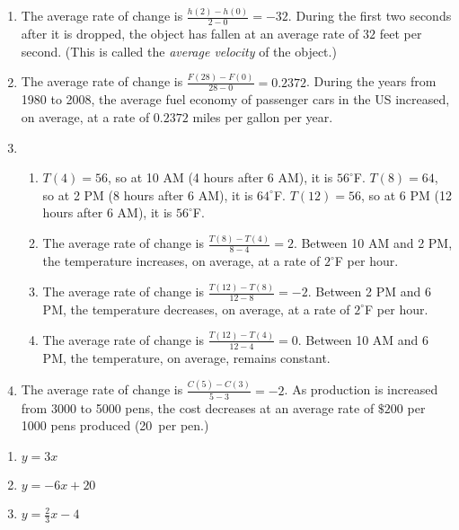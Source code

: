 \begin{enumerate}
\setcounter{enumi}{\value{HW}}


\item The average rate of change is $\frac{h(2) - h(0)}{2-0}=-32$.  During the first two seconds after it is dropped, the object has fallen at an average rate of $32$ feet per second.  (This is called the \textit{average velocity} of the object.)

\item The average rate of change is $\frac{F(28) - F(0)}{28-0}=0.2372$.  During the years from 1980 to 2008, the average fuel economy of passenger cars in the US increased, on average, at a rate of $0.2372$ miles per gallon per year.

\item 
\begin{enumerate}

\item  $T(4) = 56$, so at 10 AM (4 hours after 6 AM), it is $56^{\circ}$F.  $T(8) = 64$, so at 2 PM (8 hours after 6 AM), it is $64^{\circ}$F.  $T(12) = 56$, so at 6 PM (12 hours after 6 AM), it is $56^{\circ}$F.

\item  The average rate of change is $\frac{T(8)-T(4)}{8-4}=2$.  Between 10 AM and 2 PM, the temperature increases, on average, at a rate of $2^{\circ}$F per hour.

\item  The average rate of change is $\frac{T(12)-T(8)}{12-8}=-2$.  Between 2 PM and 6 PM, the temperature decreases, on average, at a rate of $2^{\circ}$F per hour.

\item  The average rate of change is $\frac{T(12)-T(4)}{12-4}=0$.  Between 10 AM and 6 PM, the temperature, on average, remains constant.

\end{enumerate}


\item The average rate of change is $\frac{C(5)-C(3)}{5-3}=-2$.  As production is increased from 3000 to 5000 pens, the cost decreases at an average rate of  $\$200$ per 1000 pens produced (20\textcent \, per pen.)


\setcounter{HW}{\value{enumi}}
\end{enumerate}

\begin{multicols}{3}
\begin{enumerate}
\setcounter{enumi}{\value{HW}}
\addtocounter{enumi}{1}

\item $y = 3x$
\item $y = -6x + 20$
\item $y = \frac{2}{3} x - 4$


\setcounter{HW}{\value{enumi}}
\end{enumerate}
\end{multicols}

